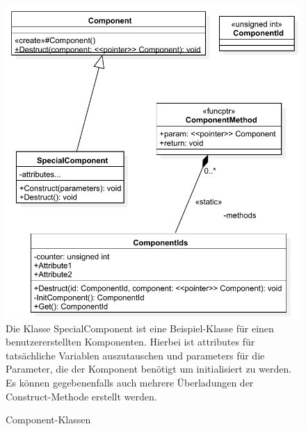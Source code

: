 \begin{figure}
	\begin{center}
		\includegraphics[width=\textwidth]{03unserprogramm/Engine/SpecialComponent.pdf}
		Die Klasse SpecialComponent ist eine Beispiel-Klasse für einen benutzererstellten Komponenten. Hierbei ist attributes für tatsächliche Variablen auszutauschen und parameters für die Parameter, die der Komponent benötigt um initialisiert zu werden. Es können gegebenenfalls auch mehrere Überladungen der Construct-Methode erstellt werden.
		\caption{Component-Klassen}\label{ClassDiagramComponents}
	\end{center}
\end{figure}

